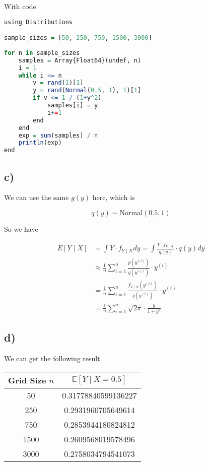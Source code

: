 \documentclass[12pt]{article}
\begin{document}
\begin{flushleft}
\qquad With code

\begin{lstlisting}[language=R]
using Distributions

sample_sizes = [50, 250, 750, 1500, 3000]
    
for n in sample_sizes 
    samples = Array{Float64}(undef, n)
    i = 1
    while i <= n
        v = rand(1)[1]
        y = rand(Normal(0.5, 1), 1)[1]
        if v <= 1 / (1+y^2)
            samples[i] = y
            i+=1 
        end
    end
    exp = sum(samples) / n
    println(exp)
end        
\end{lstlisting} 

\subsection*{c)}

\qquad We can use the same $g(y)$ here, which is

$$
q(y) \sim \text{Normal}(0.5, 1)
$$

\qquad So we have

\begin{align*}
E\left[Y\mid X\right] &= \int Y \cdot f_{Y\mid X} dy = \int \frac{Y \cdot f_{Y\mid X}}{q(y)} \cdot q(y) dy\\
&\approx \frac{1}{n} \sum_{i=1}^{n} \frac{p(y^{(i)})}{q(y^{(i)})}\cdot y^{(i)}\\
&= \frac{1}{n} \sum_{i=1}^{n} \frac{f_{Y\mid X}(y^{(i)})}{q(y^{(i)})}\cdot y^{(i)}\\
&= \frac{1}{n} \sum_{i=1}^n \sqrt{2\pi} \cdot \frac{y}{1+y^2}
\end{align*}

\subsection*{d)}

\qquad We can get the following result

\begin{table}[h]
\centering
\begin{tabular}{cc}
\hline
Grid Size $n$ & $\mathbb{E}\left[Y\mid X = 0.5\right]$ \\
\hline
50    &  0.31778840599136227  \\
250   &  0.2931960705649614 \\
750   &  0.2853944180824812  \\
1500  &  0.2609568019578496  \\
3000  &  0.2758034794541073 \\
\hline
\end{tabular}
\end{table}


\end{flushleft}
\end{document}
